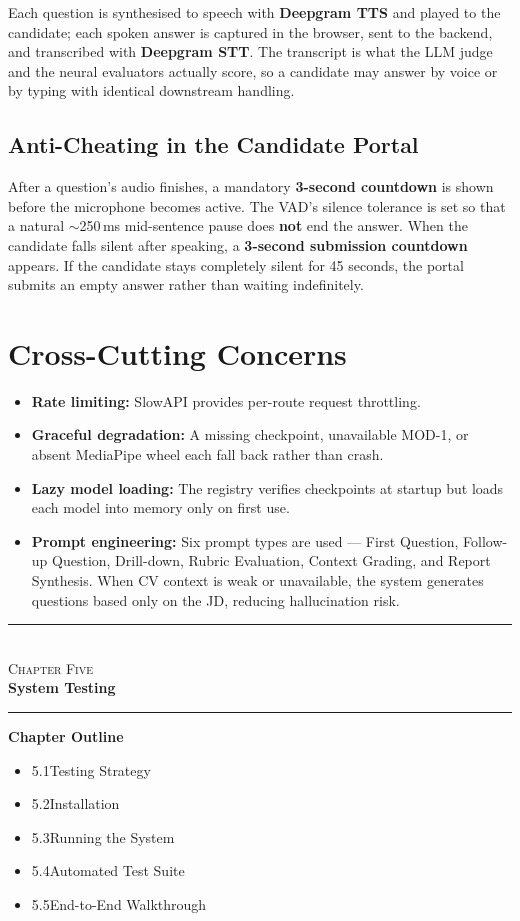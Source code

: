 \documentclass[12pt,a4paper,oneside]{report}
\newcommand{\chapterfrontpage}[3]{%
  \clearpage
  \thispagestyle{empty}
  \vspace*{4cm}
  \begin{center}
    \textcolor{ainshams}{\rule{0.6\linewidth}{1.5pt}}\\[0.6cm]
    {\LARGE\textsc{#1}}\\[0.8cm]
    {\Huge\bfseries #2}\\[0.6cm]
    \textcolor{ainshams}{\rule{0.6\linewidth}{1.5pt}}
  \end{center}
  \vspace{1.8cm}
  \begin{center}
    \begin{minipage}{0.72\linewidth}
      \textbf{\large Chapter Outline}\\[6pt]
      \begin{itemize}[leftmargin=1.4em]
        #3
      \end{itemize}
    \end{minipage}
  \end{center}
  \clearpage
}
\begin{document}
Each question is synthesised to speech with \textbf{Deepgram TTS} and played to the candidate;
each spoken answer is captured in the browser, sent to the backend, and transcribed with
\textbf{Deepgram STT}. The transcript is what the LLM judge and the neural evaluators actually
score, so a candidate may answer by voice or by typing with identical downstream handling.

\subsection{Anti-Cheating in the Candidate Portal}

After a question's audio finishes, a mandatory \textbf{3-second countdown} is shown before the
microphone becomes active. The VAD's silence tolerance is set so that a natural $\sim$250\,ms
mid-sentence pause does \textbf{not} end the answer. When the candidate falls silent after
speaking, a \textbf{3-second submission countdown} appears. If the candidate stays completely
silent for 45 seconds, the portal submits an empty answer rather than waiting indefinitely.

\section{Cross-Cutting Concerns}

\begin{itemize}
  \item \textbf{Rate limiting:} SlowAPI provides per-route request throttling.
  \item \textbf{Graceful degradation:} A missing checkpoint, unavailable MOD-1, or absent
    MediaPipe wheel each fall back rather than crash.
  \item \textbf{Lazy model loading:} The registry verifies checkpoints at startup but loads
    each model into memory only on first use.
  \item \textbf{Prompt engineering:} Six prompt types are used --- First Question, Follow-up
    Question, Drill-down, Rubric Evaluation, Context Grading, and Report Synthesis. When CV
    context is weak or unavailable, the system generates questions based only on the JD,
    reducing hallucination risk.
\end{itemize}

\chapterfrontpage{Chapter Five}{System Testing}{%
  \item 5.1\quad Testing Strategy
  \item 5.2\quad Installation
  \item 5.3\quad Running the System
  \item 5.4\quad Automated Test Suite
  \item 5.5\quad End-to-End Walkthrough
}
\end{document}
